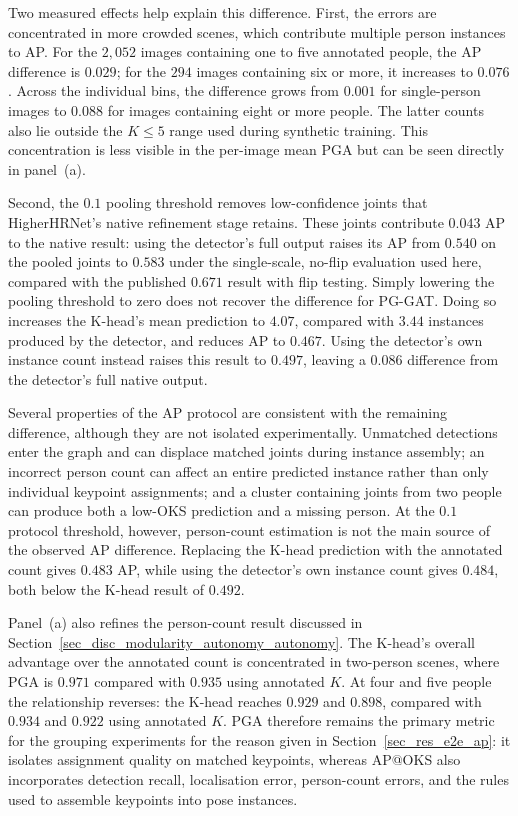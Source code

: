 Two measured effects help explain this difference.
First, the errors are concentrated in more crowded scenes, which contribute multiple person instances to AP.
For the $2{,}052$ images containing one to five annotated people, the AP difference is $0.029$;
for the $294$ images containing six or more, it increases to $0.076$.
Across the individual bins,
the difference grows from $0.001$ for single-person images to $0.088$ for images containing eight or more people.
The latter counts also lie outside the $K \leq 5$ range used during synthetic training.
This concentration is less visible in the per-image mean PGA but can be seen directly in panel~(a).

Second, the $0.1$ pooling threshold removes low-confidence joints that HigherHRNet's native refinement stage retains.
These joints contribute $0.043$ AP to the native result:
using the detector's full output raises its AP from $0.540$ on the pooled joints to $0.583$ under the single-scale,
no-flip evaluation used here,
compared with the published $0.671$ result with flip testing.
Simply lowering the pooling threshold to zero does not recover the difference for PG-GAT.
Doing so increases the K-head's mean prediction to $4.07$, compared with $3.44$ instances produced by the detector,
and reduces AP to $0.467$.
Using the detector's own instance count instead raises this result to $0.497$,
leaving a $0.086$ difference from the detector's full native output.

Several properties of the AP protocol are consistent with the remaining difference,
although they are not isolated experimentally.
Unmatched detections enter the graph and can displace matched joints during instance assembly;
an incorrect person count can affect an entire predicted instance rather than only individual keypoint assignments;
and a cluster containing joints from two people can produce both a low-OKS prediction and a missing person.
At the $0.1$ protocol threshold, however, person-count estimation is not the main source of the observed AP difference.
Replacing the K-head prediction with the annotated count gives $0.483$ AP,
while using the detector's own instance count gives $0.484$, both below the K-head result of $0.492$.

Panel~(a) also refines the person-count result discussed in Section~\ref{sec_disc_modularity_autonomy_autonomy}.
The K-head's overall advantage over the annotated count is concentrated in two-person scenes,
where PGA is $0.971$ compared with $0.935$ using annotated $K$.
At four and five people the relationship reverses:
the K-head reaches $0.929$ and $0.898$, compared with $0.934$ and $0.922$ using annotated $K$.
PGA therefore remains the primary metric for the grouping experiments for the reason given in
Section~\ref{sec_res_e2e_ap}:
it isolates assignment quality on matched keypoints,
whereas AP@OKS also incorporates detection recall, localisation error, person-count errors,
and the rules used to assemble keypoints into pose instances.